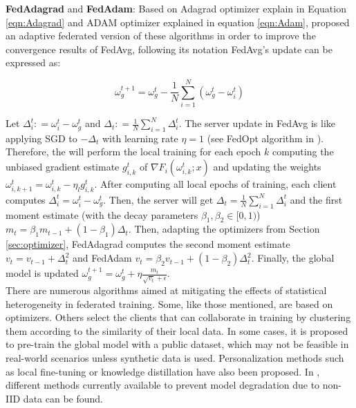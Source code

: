 \textbf{FedAdagrad} and \textbf{FedAdam}: Based on Adagrad optimizer explain in Equation \ref{eqn:Adagrad} and ADAM optimizer explained in equation \ref{eqn:Adam}, \cite{reddi2021} proposed an adaptive federated version of these algorithms in order to improve the convergence results of FedAvg, following its notation FedAvg's update can be expressed as:

\begin{equation*}
  \omega_g^{t+1} = \omega_g^t - \frac{1}{N} \sum_{i=1}^N (\omega_g^t - \omega_i^t)
\end{equation*}

Let $\Delta_i^t \colon = \omega_i^t - \omega_g^t$ and $\Delta_t \colon = \frac{1}{N} \sum_{i=1}^N \Delta_i^t$. The server update in FedAvg is like applying SGD to $-\Delta_t$ with learning rate $\eta=1$ (see FedOpt algorithm in \cite{reddi2021}). Therefore, the will perform the local training for each epoch $k$ computing the unbiased gradient estimate $g_{i,k}^t$ of $\nabla F_i(\omega_{i,k}^t; x)$ and updating the weights $\omega_{i,k+1}^t = \omega_{i,k}^t - \eta_l g_{i,k}^t$. After computing all local epochs of training, each client computes $\Delta_i^t = \omega_i^t - \omega_g^t$. Then, the server will get $\Delta_t = \frac{1}{N}\sum_{i=1}^N \Delta_i^t$ and the first moment estimate (with the decay parameters $\beta_1,\beta_2 \in [0,1)$) $m_t = \beta_1 m_{t-1} + (1-\beta_1)\Delta_t$. Then, adapting the optimizers from Section \ref{sec:optimizer}, FedAdagrad computes the second moment estimate $v_t = v_{t-1} + \Delta_t^2$ and FedAdam $v_t = \beta_2 v_{t-1} + (1-\beta_2)\Delta_t^2$. Finally, the global model is updated $\omega_g^{t+1} = \omega_g^t + \eta \frac{m_t}{\sqrt{v_t} + \epsilon}$.\\

There are numerous algorithms aimed at mitigating the effects of statistical heterogeneity in federated training. Some, like those mentioned, are based on optimizers. Others select the clients that can collaborate in training by clustering them according to the similarity of their local data. In some cases, it is proposed to pre-train the global model with a public dataset, which may not be feasible in real-world scenarios unless synthetic data is used. Personalization methods such as local fine-tuning or knowledge distillation have also been proposed. In \cite{zhu2021}, different methods currently available to prevent model degradation due to non-IID data can be found.
